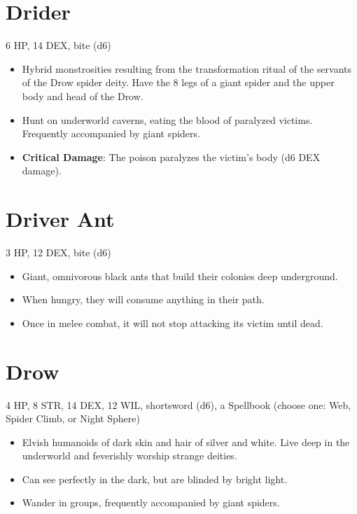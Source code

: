 \documentclass[
  10pt,
  american,
]{article}
\begin{document}
\hypertarget{drider}{%
\section{Drider}\label{drider}}

6 HP, 14 DEX, bite (d6)

\begin{samepage}
\begin{itemize}
\setlength\itemsep{-.5em}
\item Hybrid monstrosities resulting from the transformation ritual of the servants of the Drow spider deity.   Have the 8 legs of a giant spider and the upper body and head of the Drow.
\item Hunt on underworld caverns, eating the blood of paralyzed victims.   Frequently accompanied by giant spiders.
\item \textbf{Critical Damage}: The poison paralyzes the victim’s body (d6 DEX damage).
\end{itemize}
\end{samepage}

\hypertarget{driver-ant}{%
\section{Driver Ant}\label{driver-ant}}

3 HP, 12 DEX, bite (d6)

\begin{samepage}
\begin{itemize}
\setlength\itemsep{-.5em}
\item Giant, omnivorous black ants that build their colonies deep underground.
\item When hungry, they will consume anything in their path.
\item Once in melee combat, it will not stop attacking its victim until dead.
\end{itemize}
\end{samepage}

\hypertarget{drow}{%
\section{Drow}\label{drow}}

4 HP, 8 STR, 14 DEX, 12 WIL, shortsword (d6), a Spellbook (choose one:
Web, Spider Climb, or Night Sphere)

\begin{samepage}
\begin{itemize}
\setlength\itemsep{-.5em}
\item Elvish humanoids of dark skin and hair of silver and white.   Live deep in the underworld and feverishly worship strange deities.
\item Can see perfectly in the dark, but are blinded by bright light.
\item Wander in groups, frequently accompanied by giant spiders.
\end{itemize}
\end{samepage}
\end{document}
